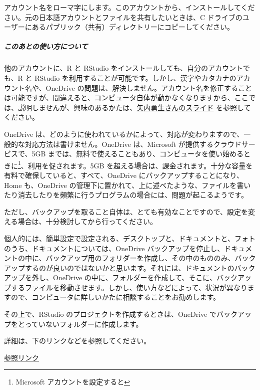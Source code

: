 \documentclass[
]{bxjsbook}
\theoremstyle{definition}
\theoremstyle{definition}
\theoremstyle{definition}
\theoremstyle{definition}
\theoremstyle{remark}
\begin{document}
アカウント名をローマ字にします。このアカウントから、インストールしてください。元の日本語アカウントとファイルを共有したいときは、C ドライブのユーザーにあるパブリック（共有）ディレクトリーにコピーしてください。

\hypertarget{ux3053ux306eux3042ux3068ux306eux4f7fux3044ux65b9ux306bux3064ux3044ux3066}{%
\subparagraph{このあとの使い方について}\label{ux3053ux306eux3042ux3068ux306eux4f7fux3044ux65b9ux306bux3064ux3044ux3066}}

他のアカウントに、R と RStudio をインストールしても、自分のアカウントでも、R と RStudio を利用することが可能です。しかし、漢字やカタカナのアカウント名や、OneDrive の問題は、解決しません。アカウント名を修正することは可能ですが、間違えると、コンピュータ自体が動かなくなりますから、ここでは、説明しませんが、興味のあるかたは、\href{https://yukiyanai.github.io/jp/resources/docs/install-R_windows.pdf}{矢内勇生さんのスライド} を参照してください。

OneDrive は、どのように使われているかによって、対応が変わりますので、一般的な対応方法は書けません。OneDrive は、Microsoft が提供するクラウドサービスで、5GB までは、無料で使えることもあり、コンピュータを使い始めるときに\footnote{Microsoft アカウントを設定すると}、利用を促されます。5GB を超える場合は、課金されます。十分な容量を有料で確保していると、すべて、OneDrive にバックアップすることになり、Home も、OneDrive の管理下に置かれて、上に述べたような、ファイルを書いたり消去したりを頻繁に行うプログラムの場合には、問題が起こるようです。

ただし、バックアップを取ること自体は、とても有効なことですので、設定を変える場合は、十分検討してから行ってください。

個人的には、簡単設定で設定される、デスクトップと、ドキュメントと、フォトのうち、ドキュメントについては、OneDrive バックアップを停止し、ドキュメントの中に、バックアップ用のフォリダーを作成し、その中のもののみ、バックアップするのが良いのではないかと思います。それには、ドキュメントのバックアップを外し、OneDrive の中に、フォルダーを作成して、そこに、バックアップするファイルを移動させます。しかし、使い方などによって、状況が異なりますので、コンピュータに詳しいかたに相談することをお勧めします。

その上で、RStudio のプロジェクトを作成するときは、OneDrive でバックアップをとっていないフォルダーに作成します。

詳細は、下のリンクなどを参照してください。

\href{https://icu-hsuzuki.github.io/myds/techmemo.html\#windows-installation-of-r-rstudio-tex}{参照リンク}
\end{document}
